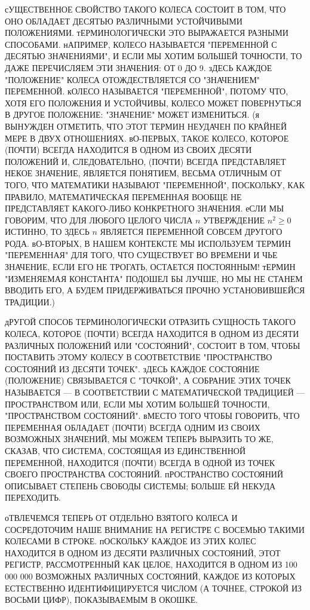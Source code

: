 сУЩЕСТВЕННОЕ СВОЙСТВО ТАКОГО КОЛЕСА СОСТОИТ В ТОМ, ЧТО ОНО
ОБЛАДАЕТ ДЕСЯТЬЮ РАЗЛИЧНЫМИ УСТОЙЧИВЫМИ
ПОЛОЖЕНИЯМИ. тЕРМИНОЛОГИЧЕСКИ ЭТО ВЫРАЖАЕТСЯ
РАЗНЫМИ СПОСОБАМИ. нАПРИМЕР, КОЛЕСО НАЗЫВАЕТСЯ
"ПЕРЕМЕННОЙ С ДЕСЯТЬЮ ЗНАЧЕНИЯМИ", И ЕСЛИ МЫ
ХОТИМ БОЛЬШЕЙ ТОЧНОСТИ, ТО ДАЖЕ ПЕРЕЧИСЛЯЕМ ЭТИ
ЗНАЧЕНИЯ: ОТ 0 ДО 9. зДЕСЬ КАЖДОЕ "ПОЛОЖЕНИЕ"
КОЛЕСА ОТОЖДЕСТВЛЯЕТСЯ СО "ЗНАЧЕНИЕМ"
ПЕРЕМЕННОЙ. кОЛЕСО НАЗЫВАЕТСЯ "ПЕРЕМЕННОЙ",
ПОТОМУ ЧТО, ХОТЯ ЕГО ПОЛОЖЕНИЯ И УСТОЙЧИВЫ,
КОЛЕСО МОЖЕТ ПОВЕРНУТЬСЯ В ДРУГОЕ ПОЛОЖЕНИЕ:
"ЗНАЧЕНИЕ" МОЖЕТ ИЗМЕНИТЬСЯ. (я ВЫНУЖДЕН
ОТМЕТИТЬ, ЧТО ЭТОТ ТЕРМИН НЕУДАЧЕН ПО КРАЙНЕЙ
МЕРЕ В ДВУХ ОТНОШЕНИЯХ. вО-ПЕРВЫХ, ТАКОЕ КОЛЕСО,
КОТОРОЕ (ПОЧТИ) ВСЕГДА НАХОДИТСЯ В ОДНОМ ИЗ
СВОИХ ДЕСЯТИ ПОЛОЖЕНИЙ И, СЛЕДОВАТЕЛЬНО, (ПОЧТИ)
ВСЕГДА ПРЕДСТАВЛЯЕТ НЕКОЕ ЗНАЧЕНИЕ, ЯВЛЯЕТСЯ
ПОНЯТИЕМ, ВЕСЬМА ОТЛИЧНЫМ ОТ ТОГО, ЧТО
МАТЕМАТИКИ НАЗЫВАЮТ "ПЕРЕМЕННОЙ", ПОСКОЛЬКУ, КАК
ПРАВИЛО, МАТЕМАТИЧЕСКАЯ ПЕРЕМЕННАЯ ВООБЩЕ НЕ
ПРЕДСТАВЛЯЕТ
КАКОГО-ЛИБО КОНКРЕТНОГО ЗНАЧЕНИЯ. еСЛИ МЫ ГОВОРИМ, ЧТО
ДЛЯ ЛЮБОГО ЦЕЛОГО ЧИСЛА $n$ УТВЕРЖДЕНИЕ
$n^2\ge0$ ИСТИННО, ТО ЗДЕСЬ $n$ ЯВЛЯЕТСЯ
ПЕРЕМЕННОЙ СОВСЕМ ДРУГОГО РОДА.
вО-ВТОРЫХ, В НАШЕМ КОНТЕКСТЕ МЫ ИСПОЛЬЗУЕМ ТЕРМИН
"ПЕРЕМЕННАЯ" ДЛЯ ТОГО, ЧТО СУЩЕСТВУЕТ ВО ВРЕМЕНИ
И ЧЬЕ ЗНАЧЕНИЕ, ЕСЛИ ЕГО НЕ ТРОГАТЬ, ОСТАЕТСЯ
ПОСТОЯННЫМ! тЕРМИН "ИЗМЕНЯЕМАЯ КОНСТАНТА"
ПОДОШЕЛ БЫ ЛУЧШЕ, НО МЫ НЕ СТАНЕМ ВВОДИТЬ ЕГО, А
БУДЕМ ПРИДЕРЖИВАТЬСЯ ПРОЧНО УСТАНОВИВШЕЙСЯ
ТРАДИЦИИ.)

дРУГОЙ СПОСОБ ТЕРМИНОЛОГИЧЕСКИ ОТРАЗИТЬ СУЩНОСТЬ
ТАКОГО КОЛЕСА, КОТОРОЕ (ПОЧТИ) ВСЕГДА НАХОДИТСЯ
В ОДНОМ ИЗ ДЕСЯТИ РАЗЛИЧНЫХ ПОЛОЖЕНИЙ ИЛИ
"СОСТОЯНИЙ", СОСТОИТ В ТОМ, ЧТОБЫ ПОСТАВИТЬ
ЭТОМУ КОЛЕСУ В СООТВЕТСТВИЕ "ПРОСТРАНСТВО
СОСТОЯНИЙ ИЗ ДЕСЯТИ ТОЧЕК". зДЕСЬ КАЖДОЕ
СОСТОЯНИЕ (ПОЛОЖЕНИЕ) СВЯЗЫВАЕТСЯ С "ТОЧКОЙ", А
СОБРАНИЕ ЭТИХ ТОЧЕК НАЗЫВАЕТСЯ --- В
СООТВЕТСТВИИ С МАТЕМАТИЧЕСКОЙ ТРАДИЦИЕЙ
--- ПРОСТРАНСТВОМ ИЛИ, ЕСЛИ  МЫ ХОТИМ БОЛЬШЕЙ
ТОЧНОСТИ, "ПРОСТРАНСТВОМ СОСТОЯНИЙ". вМЕСТО ТОГО
ЧТОБЫ ГОВОРИТЬ, ЧТО ПЕРЕМЕННАЯ ОБЛАДАЕТ (ПОЧТИ)
ВСЕГДА ОДНИМ ИЗ СВОИХ ВОЗМОЖНЫХ ЗНАЧЕНИЙ, МЫ
МОЖЕМ ТЕПЕРЬ ВЫРАЗИТЬ ТО ЖЕ, СКАЗАВ, ЧТО
СИСТЕМА, СОСТОЯЩАЯ ИЗ ЕДИНСТВЕННОЙ ПЕРЕМЕННОЙ,
НАХОДИТСЯ (ПОЧТИ) ВСЕГДА В ОДНОЙ ИЗ ТОЧЕК СВОЕГО
ПРОСТРАНСТВА СОСТОЯНИЙ. пРОСТРАНСТВО СОСТОЯНИЙ
ОПИСЫВАЕТ СТЕПЕНЬ СВОБОДЫ СИСТЕМЫ; БОЛЬШЕ ЕЙ
НЕКУДА ПЕРЕХОДИТЬ.

оТВЛЕЧЕМСЯ ТЕПЕРЬ ОТ ОТДЕЛЬНО ВЗЯТОГО КОЛЕСА И
СОСРЕДОТОЧИМ НАШЕ ВНИМАНИЕ НА РЕГИСТРЕ С ВОСЕМЬЮ
ТАКИМИ КОЛЕСАМИ В СТРОКЕ. пОСКОЛЬКУ КАЖДОЕ ИЗ
ЭТИХ КОЛЕС НАХОДИТСЯ В ОДНОМ ИЗ ДЕСЯТИ РАЗЛИЧНЫХ
СОСТОЯНИЙ, ЭТОТ РЕГИСТР, РАССМОТРЕННЫЙ КАК
ЦЕЛОЕ, НАХОДИТСЯ В ОДНОМ ИЗ 100 000 000
ВОЗМОЖНЫХ РАЗЛИЧНЫХ СОСТОЯНИЙ, КАЖДОЕ ИЗ КОТОРЫХ
ЕСТЕСТВЕННО ИДЕНТИФИЦИРУЕТСЯ ЧИСЛОМ (А ТОЧНЕЕ,
СТРОКОЙ ИЗ ВОСЬМИ ЦИФР), ПОКАЗЫВАЕМЫМ В ОКОШКЕ.

